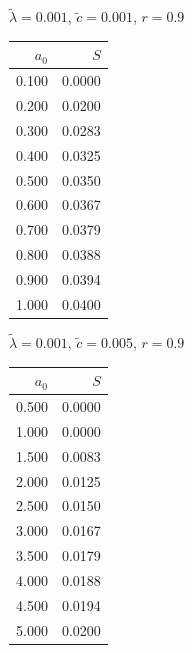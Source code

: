 \documentclass[11pt,a4paper,dvipsnames,twosided]{article}
\begin{document}
\begin{minipage}[t]{\textwidth}
    \begin{minipage}[t]{0.32\textwidth}
        \footnotesize
        \begin{flushleft}$\tilde{\lambda}=0.001$, $\tilde{c}=0.001$, $r=0.9$\end{flushleft}
        \begin{tabular}[t]{rr}
            $a_0$ & $S$ \\
            \hline
             0.100 & 0.0000 \\
             0.200 & 0.0200 \\
             0.300 & 0.0283 \\
             0.400 & 0.0325 \\
             0.500 & 0.0350 \\
             0.600 & 0.0367 \\
             0.700 & 0.0379 \\
             0.800 & 0.0388 \\
             0.900 & 0.0394 \\
             1.000 & 0.0400 \\
        \end{tabular}
    \end{minipage}
    \begin{minipage}[t]{0.32\textwidth}
        \footnotesize
        \begin{flushleft}$\tilde{\lambda}=0.001$, $\tilde{c}=0.005$, $r=0.9$\end{flushleft}
        \begin{tabular}[t]{rr}
            $a_0$ & $S$ \\
            \hline
             0.500 & 0.0000 \\
             1.000 & 0.0000 \\
             1.500 & 0.0083 \\
             2.000 & 0.0125 \\
             2.500 & 0.0150 \\
             3.000 & 0.0167 \\
             3.500 & 0.0179 \\
             4.000 & 0.0188 \\
             4.500 & 0.0194 \\
             5.000 & 0.0200 \\
        \end{tabular}
    \end{minipage}
    \begin{minipage}[t]{0.32\textwidth}

\end{minipage}
\end{minipage}
\end{document}
